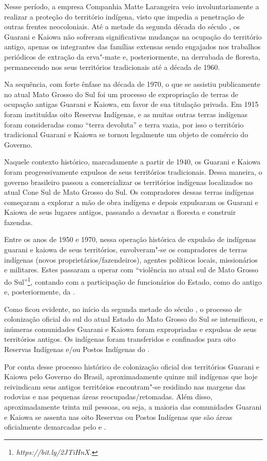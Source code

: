 Nesse período, a empresa Companhia Matte Larangeira veio
involuntariamente a realizar a proteção do território indígena, visto
que impedia a penetração de outras frentes neocoloniais. Até a metade
da segunda década do século , os Guarani e Kaiowa não sofreram
significativas mudanças na ocupação do território antigo, apenas os
integrantes das famílias extensas sendo engajados nos trabalhos
periódicos de extração da erva"-mate e, posteriormente, na derrubada de
floresta, permanecendo nos seus territórios tradicionais até a década
de 1960.

Na sequência, com forte ênfase na década de 1970, o que se assistiu
publicamente no atual Mato Grosso do Sul foi um processo de
expropriação de terras de ocupação antigas Guarani e Kaiowa, em favor
de sua titulação privada. Em 1915 foram instituídas oito Reservas
Indígenas, e as muitas outras terras indígenas foram consideradas como
``terra devoluta'' e terra vazia, por isso o território tradicional
Guarani e Kaiowa se tornou legalmente um objeto de comércio do Governo.


Naquele contexto histórico, marcadamente a partir de 1940, os Guarani e
Kaiowa foram progressivamente expulsos de seus territórios
tradicionais. Dessa maneira, o governo brasileiro passou a
comercializar os territórios indígenas localizados no atual Cone Sul de
Mato Grosso do Sul. Os compradores dessas terras indígenas começaram a
explorar a mão de obra indígena e depois expulsaram os Guarani e Kaiowa
de seus lugares antigos, passando a devastar a floresta e construir
fazendas.

Entre os anos de 1950 e 1970, nessa operação histórica de expulsão de
indígenas guarani e kaiowa de seus territórios, envolveram"-se os
compradores de terras indígenas (novos proprietários/fazendeiros),
agentes políticos locais, missionários e militares. Estes passaram a
operar com ``violência no atual sul de Mato Grosso do Sul''\footnote{\emph{https://bit.ly/2JTiHnX.}}, contando com a
participação de funcionários do Estado, como do antigo  e,
posteriormente, da . 

Como ficou evidente, no início da segunda metade do século , o
processo de colonização oficial do sul do atual Estado do Mato Grosso
do Sul se intensificou, e inúmeras comunidades Guarani e Kaiowa foram
expropriadas e expulsas de seus territórios antigos. Os indígenas foram
transferidos e confinados para oito Reservas Indígenas e/ou Postos
Indígenas do . 

Por conta desse processo histórico de colonização oficial dos
territórios Guarani e Kaiowa pelo Governo do Brasil, aproximadamente
quinze mil indígenas que hoje reivindicam seus antigos territórios
encontram"-se residindo nas margens das rodovias e nas pequenas áreas
reocupadas/retomadas. Além disso, aproximadamente trinta mil pessoas,
ou seja, a maioria das comunidades Guarani e Kaiowa se assenta nas oito
Reservas ou Postos Indígenas que são áreas oficialmente demarcadas pelo
 e . 

